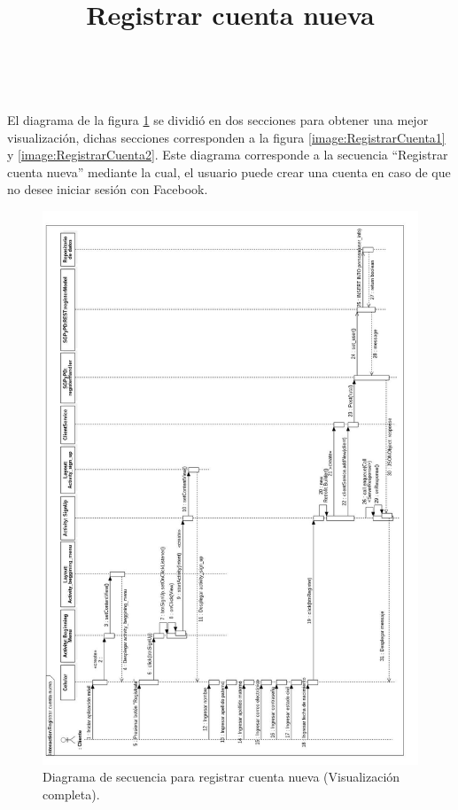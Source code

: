 \title{\textbf{Registrar cuenta nueva}}
\\ \par
El diagrama de la figura \ref{image:RegistrarCuenta} se dividió en dos secciones para obtener una mejor visualización, dichas secciones corresponden a la figura \ref{image:RegistrarCuenta1} y \ref{image:RegistrarCuenta2}. Este diagrama corresponde a la secuencia ``Registrar cuenta nueva'' mediante la cual, el usuario puede crear una cuenta en caso de que no desee iniciar sesión con Facebook.
\FloatBarrier
\begin{figure}[htbp!]
		\centering
			\includegraphics[width=0.9 \textwidth]{imagenes/Diagramas_UserApp/Nuevos_diagramas/Horizontal/cuentaNueva}
		\caption{Diagrama de secuencia para registrar cuenta nueva (Visualización completa).}
		\label{image:RegistrarCuenta}
\end{figure}
\FloatBarrier

